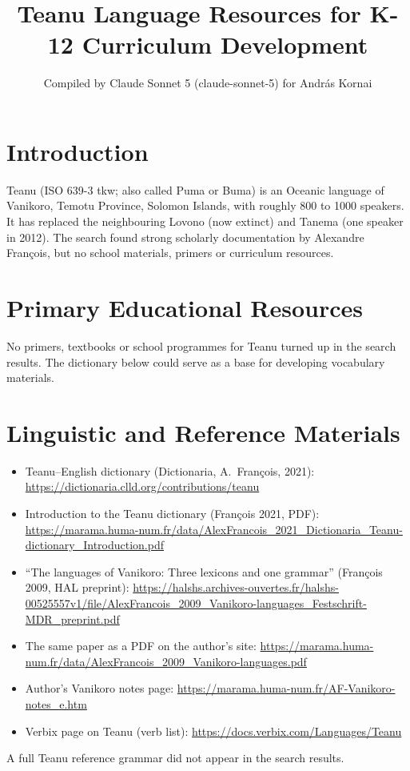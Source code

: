 \documentclass[12pt]{article}
\title{Teanu Language Resources for K-12 Curriculum Development}
\author{Compiled by Claude Sonnet 5 (claude-sonnet-5) for Andr\'as Kornai}
\date{}
\begin{document}
\maketitle

\section{Introduction}
Teanu (ISO 639-3 tkw; also called Puma or Buma) is an Oceanic language of Vanikoro, Temotu Province, Solomon Islands, with roughly 800 to 1000 speakers. It has replaced the neighbouring Lovono (now extinct) and Tanema (one speaker in 2012). The search found strong scholarly documentation by Alexandre Fran\c{c}ois, but no school materials, primers or curriculum resources.

\section{Primary Educational Resources}
No primers, textbooks or school programmes for Teanu turned up in the search results. The dictionary below could serve as a base for developing vocabulary materials.

\section{Linguistic and Reference Materials}
\begin{itemize}
\item Teanu--English dictionary (Dictionaria, A.\ Fran\c{c}ois, 2021): \url{https://dictionaria.clld.org/contributions/teanu}
\item Introduction to the Teanu dictionary (Fran\c{c}ois 2021, PDF): \url{https://marama.huma-num.fr/data/AlexFrancois_2021_Dictionaria_Teanu-dictionary_Introduction.pdf}
\item ``The languages of Vanikoro: Three lexicons and one grammar'' (Fran\c{c}ois 2009, HAL preprint): \url{https://halshs.archives-ouvertes.fr/halshs-00525557v1/file/AlexFrancois_2009_Vanikoro-languages_Festschrift-MDR_preprint.pdf}
\item The same paper as a PDF on the author's site: \url{https://marama.huma-num.fr/data/AlexFrancois_2009_Vanikoro-languages.pdf}
\item Author's Vanikoro notes page: \url{https://marama.huma-num.fr/AF-Vanikoro-notes_e.htm}
\item Verbix page on Teanu (verb list): \url{https://docs.verbix.com/Languages/Teanu}
\end{itemize}
A full Teanu reference grammar did not appear in the search results.
\end{document}
